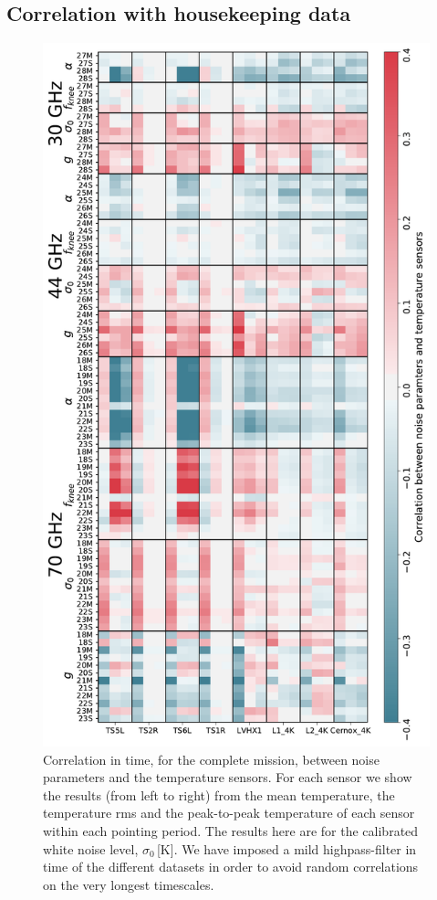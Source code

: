 \documentclass[twocolumn]{aa}
\begin{document}
\subsection{Correlation with housekeeping data}
\begin{figure}
	\begin{center}
		\includegraphics[width=\linewidth]{figs/corr_hk.pdf}
	\end{center}
	\caption{Correlation in time, for the complete mission, between noise parameters and the temperature sensors. For each sensor we show the results (from left to right) from the mean temperature, the temperature rms and the peak-to-peak temperature of each sensor within each pointing period. The results here are for the calibrated white noise level, $\sigma_0$\,[K]. We have imposed a mild highpass-filter in time of the different datasets in order to avoid random correlations on the very longest timescales.
		\label{fig:hk_corr}}
\end{figure}
\end{document}
